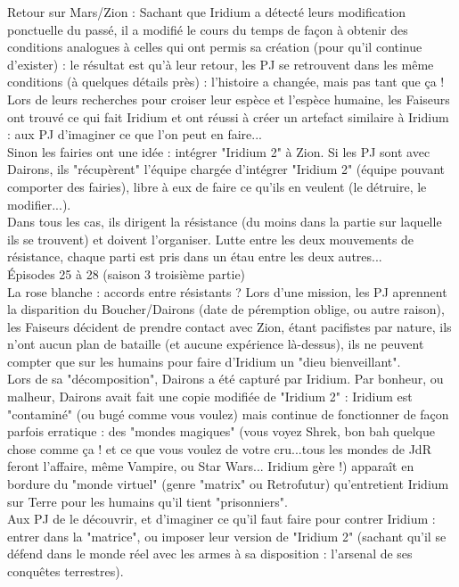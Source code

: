\documentclass[11pt,twoside,a4paper]{book}
\begin{document}
Retour sur Mars/Zion : Sachant que Iridium a d{\'e}tect{\'e} leurs modification ponctuelle du pass{\'e}, il a modifi{\'e} le cours du temps de fa\c{c}on {\`a} obtenir des conditions analogues {\`a} celles qui ont permis sa cr{\'e}ation (pour qu'il continue d'exister) : le r{\'e}sultat est qu'{\`a} leur retour, les PJ se retrouvent dans les m{\^e}me conditions ({\`a} quelques d{\'e}tails pr{\`e}s) : l'histoire a chang{\'e}e, mais pas tant que \c{c}a ! ~\\
Lors de leurs recherches pour croiser leur esp{\`e}ce et l'esp{\`e}ce humaine, les Faiseurs ont trouv{\'e} ce qui fait Iridium et ont r{\'e}ussi {\`a} cr{\'e}er un artefact similaire {\`a} Iridium : aux PJ d'imaginer ce que l'on peut en faire... ~\\
Sinon les fairies ont une id{\'e}e : int{\'e}grer "Iridium 2" {\`a} Zion. Si les PJ sont avec Dairons, ils "r{\'e}cup{\`e}rent" l'{\'e}quipe charg{\'e}e d'int{\'e}grer "Iridium 2" ({\'e}quipe pouvant comporter des fairies), libre {\`a} eux de faire ce qu'ils en veulent (le d{\'e}truire, le modifier...). ~\\
Dans tous les cas, ils dirigent la r{\'e}sistance (du moins dans la partie sur laquelle ils se trouvent) et doivent l'organiser. Lutte entre les deux mouvements de r{\'e}sistance, chaque parti est pris dans un {\'e}tau entre les deux autres... ~\\


{\'E}pisodes 25 {\`a} 28 (saison 3 troisi{\`e}me partie) ~\\
La rose blanche : accords entre r{\'e}sistants ? Lors d'une mission, les PJ aprennent la disparition du Boucher/Dairons (date de p{\'e}remption oblige, ou autre raison), les Faiseurs d{\'e}cident de prendre contact avec Zion, {\'e}tant pacifistes par nature, ils n'ont aucun plan de bataille (et aucune exp{\'e}rience l{\`a}-dessus), ils ne peuvent compter que sur les humains pour faire d'Iridium un "dieu bienveillant". ~\\
Lors de sa "d{\'e}composition", Dairons a {\'e}t{\'e} captur{\'e} par Iridium. Par bonheur, ou malheur, Dairons avait fait une copie modifi{\'e}e de "Iridium 2" : Iridium est "contamin{\'e}" (ou bug{\'e} comme vous voulez) mais continue de fonctionner de fa\c{c}on parfois erratique : des "mondes magiques" (vous voyez Shrek, bon bah quelque chose comme \c{c}a ! et ce que vous voulez de votre cru...tous les mondes de JdR feront l'affaire, m{\^e}me Vampire, ou Star Wars... Iridium g{\`e}re !) appara{\^i}t en bordure du "monde virtuel" (genre "matrix" ou Retrofutur) qu'entretient Iridium sur Terre pour les humains qu'il tient "prisonniers". ~\\
Aux PJ de le d{\'e}couvrir, et d'imaginer ce qu'il faut faire pour contrer Iridium : entrer dans la "matrice", ou imposer leur version de "Iridium 2" (sachant qu'il se d{\'e}fend dans le monde r{\'e}el avec les armes {\`a} sa disposition : l'arsenal de ses conqu{\^e}tes terrestres). ~\\
\end{document}
